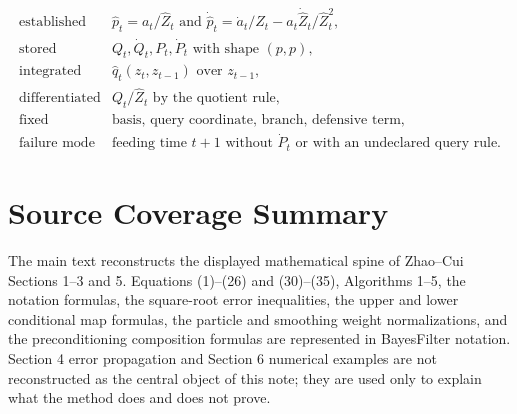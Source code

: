 \documentclass[11pt]{article}
\begin{document}
\[
\begin{array}{ll}
\text{established} &
    \widehat p_t=a_t/\widehat Z_t
    \text{ and }
    \dot{\widehat p}_t=\dot a_t/\widehat Z_t
    -a_t\dot{\widehat Z}_t/\widehat Z_t^2,\\[1mm]
\text{stored} &
    Q_t,\dot Q_t,P_t,\dot P_t
    \text{ with shape }(p,p),\\[1mm]
\text{integrated} &
    \widehat q_t(z_t,z_{t-1}) \text{ over } z_{t-1},\\[1mm]
\text{differentiated} &
    Q_t/\widehat Z_t \text{ by the quotient rule},\\[1mm]
\text{fixed} &
    \text{basis, query coordinate, branch, defensive term},\\[1mm]
\text{failure mode} &
    \text{feeding time }t+1\text{ without }\dot P_t
    \text{ or with an undeclared query rule.}
\end{array}
\tag{P22-R4}
\]

\appendix
\section{Source Coverage Summary}

The main text reconstructs the displayed mathematical spine of Zhao--Cui
Sections 1--3 and 5.  Equations (1)--(26) and (30)--(35), Algorithms 1--5,
the notation formulas, the square-root error inequalities, the upper and lower
conditional map formulas, the particle and smoothing weight normalizations, and
the preconditioning composition formulas are represented in BayesFilter
notation.  Section 4 error propagation and Section 6 numerical examples are
not reconstructed as the central object of this note; they are used only to
explain what the method does and does not prove.
\end{document}
